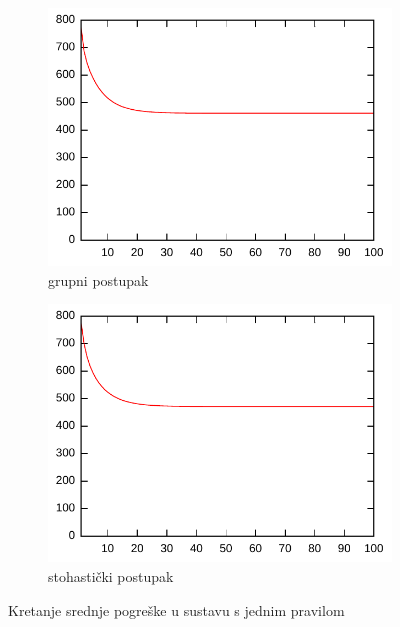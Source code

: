 \documentclass{article}
\begin{document}
\begin{figure}[h]
    \centering
    \begin{subfigure}[b]{0.49\textwidth}
        \centering
        \includegraphics[width=\textwidth]{img/mse-batch-1.pdf}
        \caption{grupni postupak}
    \end{subfigure}
    \hfill
    \begin{subfigure}[b]{0.49\textwidth}
        \centering
        \includegraphics[width=\textwidth]{img/mse-stochastic-1.pdf}
        \caption{stohastički postupak}
    \end{subfigure}
    \hfill
    \caption{Kretanje srednje pogreške u sustavu s jednim pravilom}
    \label{mse-1}
\end{figure}
\end{document}
